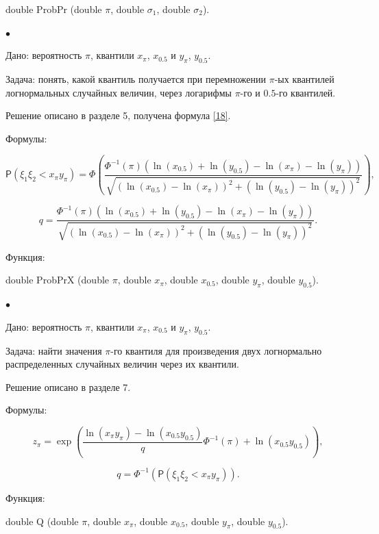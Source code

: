 \documentclass[12pt]{article}
\begin{document}
	double ProbPr (double $\pi$, double $\sigma_{1}$, double $\sigma_{2}$).
	
	$\bullet$
	
	Дано:
	вероятность $\pi$, квантили $x_{\pi}$, $x_{0.5}$ и $y_{\pi}$, $y_{0.5}$.
	
	Задача:
	понять, какой квантиль получается при перемножении $\pi$-ых квантилей логнормальных случайных величин, через логарифмы $\pi$-го и $0.5$-го квантилей.
	
	Решение описано в разделе 5, получена формула \eqref{18}.
	
	Формулы:
	
	\begin{equation*}
		\mathsf{P}(\xi_{1}\xi_{2}< x_{\pi}y_{\pi}) =\Phi\left(\frac{\Phi^{-1}(\pi)(\ln(x_{0.5})+\ln(y_{0.5})-\ln(x_{\pi})-\ln(y_{\pi}))}{\sqrt{(\ln(x_{0.5})-\ln(x_{\pi}))^{2}+(\ln(y_{0.5})-\ln(y_{\pi}))^{2}}}\right),
	\end{equation*}
	
	\begin{equation*}
		q =\frac{\Phi^{-1}(\pi)(\ln(x_{0.5})+\ln(y_{0.5})-\ln(x_{\pi})-\ln(y_{\pi}))}{\sqrt{(\ln(x_{0.5})-\ln(x_{\pi}))^{2}+(\ln(y_{0.5})-\ln(y_{\pi}))^{2}}}.
	\end{equation*}
	
	Функция:
	
	double ProbPrX (double $\pi$, double $x_{\pi}$, double $x_{0.5}$, double $y_{\pi}$, double $y_{0.5}$).
	
	
	$\bullet$
	
	Дано:
	вероятность $\pi$, квантили $x_{\pi}$, $x_{0.5}$ и $y_{\pi}$, $y_{0.5}$.
	
	Задача:
	найти значения $\pi$-го квантиля для произведения двух логнормально распределенных случайных величин через их квантили.
	
	Решение описано в разделе 7.
	
	Формулы:
	
	\begin{equation*}
		z_{\pi}=\exp\left(\dfrac{\ln(x_{\pi}y_{\pi})-\ln(x_{0.5}y_{0.5})}{q}\Phi^{-1}(\pi)+\ln(x_{0.5}y_{0.5})\right),
	\end{equation*}
	
	\begin{equation*}
		q=\Phi^{-1}(\mathsf{P}(\xi_{1}\xi_{2}< x_{\pi}y_{\pi})).
	\end{equation*}
	
	Функция:
	
	double Q (double $\pi$, double $x_{\pi}$, double $x_{0.5}$, double $y_{\pi}$, double $y_{0.5}$).
	
	
	
\end{document}
